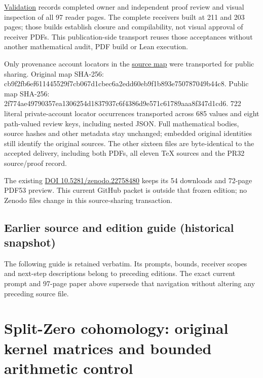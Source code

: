 \documentclass[
]{article}
\begin{document}
\href{https://github.com/KokunoYumeto/zeta-function-research-reader/blob/main/workbenches/splitzero-tandem/continuations/20260914-conductor-kernel-continuation/12_VALIDATION.md}{Validation}
records completed owner and independent proof review and visual
inspection of all 97 reader pages. The complete receivers built at 211
and 203 pages; those builds establish closure and compilability, not
visual approval of receiver PDFs. This publication-side transport reuses
those acceptances without another mathematical audit, PDF build or Lean
execution.

Only provenance account locators in the
\href{https://github.com/KokunoYumeto/zeta-function-research-reader/blob/main/workbenches/splitzero-tandem/continuations/20260914-conductor-kernel-continuation/11_SOURCE_MAP.json}{source
map} were transported for public sharing. Original map SHA-256:
cb9f2fb6ef611445529f7cb067d1cbec6a2edd60eb9f1b893e750787049b44c8. Public
map SHA-256:
2f774ae49790357ea1306254d1837937c6f4386d9e571c61789aaa8f347d1cd6. 722
literal private-account locator occurrences transported across 685
values and eight path-valued review keys, including nested JSON. Full
mathematical bodies, source hashes and other metadata stay unchanged;
embedded original identities still identify the original sources. The
other sixteen files are byte-identical to the accepted delivery,
including both PDFs, all eleven TeX sources and the PR32 source/proof
record.

The existing \href{https://doi.org/10.5281/zenodo.22758480}{DOI
10.5281/zenodo.22758480} keeps its 54 downloads and 72-page PDF53
preview. This current GitHub packet is outside that frozen edition; no
Zenodo files change in this source-sharing transaction.

\subsection{Earlier source and edition guide (historical
snapshot)}\label{earlier-source-and-edition-guide-historical-snapshot-13}

The following guide is retained verbatim. Its prompts, bounds, receiver
scopes and next-step descriptions belong to preceding editions. The
exact current prompt and 97-page paper above supersede that navigation
without altering any preceding source file.

\section{Split-Zero cohomology: original kernel matrices and bounded
arithmetic
control}\label{split-zero-cohomology-original-kernel-matrices-and-bounded-arithmetic-control}
\end{document}
